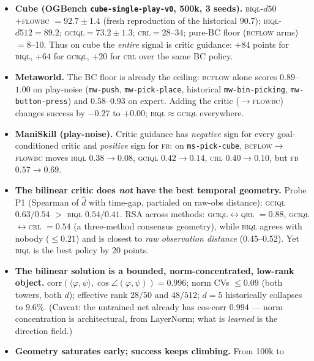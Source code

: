 \documentclass[10pt]{article}
\newcommand{\ip}[2]{\langle #1, #2 \rangle}
\begin{document}
\begin{itemize}
\item[\textbf{E1}] \textbf{Cube (OGBench \texttt{cube-single-play-v0}, 500k, 3 seeds).}
  \textsc{biql}-$d50$+\textsc{flowbc} $=92.7\pm1.4$ (fresh reproduction of the historical
  $90.7$); \textsc{biql}-$d512=89.2$; \textsc{gciql}$=73.2\pm1.3$; \textsc{crl}$=28$--$34$;
  pure-BC floor (\textsc{bcflow} arms) $=8$--$10$. Thus on cube the \emph{entire} signal is
  critic guidance: $+84$ points for \textsc{biql}, $+64$ for \textsc{gciql}, $+20$ for
  \textsc{crl} over the same BC policy.
\item[\textbf{E2}] \textbf{Metaworld.} The BC floor is already the ceiling:
  \textsc{bcflow} alone scores $0.89$--$1.00$ on play-noise (\texttt{mw-push},
  \texttt{mw-pick-place}, historical \texttt{mw-bin-picking}, \texttt{mw-button-press}) and
  $0.58$--$0.93$ on expert. Adding the critic ($\to$\textsc{flowbc}) changes success by
  $-0.27$ to $+0.00$; \textsc{biql}${\approx}$\textsc{gciql} everywhere.
\item[\textbf{E3}] \textbf{ManiSkill (play-noise).} Critic guidance has \emph{negative} sign
  for every goal-conditioned critic and \emph{positive} sign for \textsc{fb}:
  on \texttt{ms-pick-cube}, \textsc{bcflow}$\to$\textsc{flowbc} moves \textsc{biql}
  $0.38\to0.08$, \textsc{gciql} $0.42\to0.14$, \textsc{crl} $0.40\to0.10$, but \textsc{fb}
  $0.57\to0.69$.
\item[\textbf{E4}] \textbf{The bilinear critic does \emph{not} have the best temporal
  geometry.} Probe P1 (Spearman of $\hat d$ with time-gap, partialed on raw-obs distance):
  \textsc{gciql} $0.63/0.54$ $>$ \textsc{biql} $0.54/0.41$. RSA across methods:
  \textsc{gciql}$\leftrightarrow$\textsc{qrl} $=0.88$,
  \textsc{gciql}$\leftrightarrow$\textsc{crl} $=0.54$ (a three-method consensus geometry),
  while \textsc{biql} agrees with nobody ($\le 0.21$) and is closest to \emph{raw
  observation distance} ($0.45$--$0.52$). Yet \textsc{biql} is the best policy by 20 points.
\item[\textbf{E5}] \textbf{The bilinear solution is a bounded, norm-concentrated, low-rank
  object.} $\mathrm{corr}(\ip{\varphi}{\psi},\cos\angle(\varphi,\psi))=0.996$;
  norm CVs $\le 0.09$ (both towers, both $d$); effective rank $28/50$ and $48/512$;
  $d{=}5$ historically collapses to $9.6\%$. (Caveat: the untrained net already has
  cos-corr $0.994$ --- norm concentration is architectural, from LayerNorm; what is
  \emph{learned} is the direction field.)
\item[\textbf{E6}] \textbf{Geometry saturates early; success keeps climbing.} From 100k to

\end{itemize}
\end{document}
